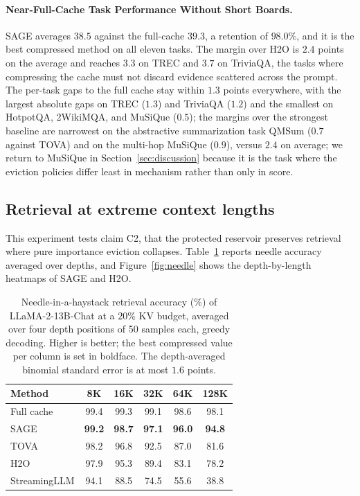 \paragraph{Near-Full-Cache Task Performance Without Short Boards.}
SAGE averages $38.5$ against the full-cache $39.3$, a retention of
$98.0\%$, and it is the best compressed method on all eleven tasks.
The margin over H2O is $2.4$ points on the average and reaches
$3.3$ on TREC and $3.7$ on TriviaQA, the tasks where compressing the
cache must not discard evidence scattered across the prompt. The
per-task gaps to the full cache stay within $1.3$ points everywhere,
with the largest absolute gaps on TREC ($1.3$) and TriviaQA ($1.2$)
and the smallest on HotpotQA, 2WikiMQA, and MuSiQue ($0.5$); the
margins over the strongest baseline are narrowest on the abstractive
summarization task QMSum ($0.7$ against TOVA) and on the multi-hop
MuSiQue ($0.9$), versus $2.4$ on average; we return to MuSiQue in
Section~\ref{sec:discussion} because it is the task where the eviction
policies differ least in mechanism rather than only in score.

\subsection{Retrieval at extreme context lengths}\label{sec:exp_needle}

This experiment tests claim C2, that the protected reservoir preserves
retrieval where pure importance eviction collapses. Table~\ref{tab:needle}
reports needle accuracy averaged over depths, and
Figure~\ref{fig:needle} shows the depth-by-length heatmaps of SAGE and
H2O.

\begin{table}[t]
\centering
\caption{Needle-in-a-haystack retrieval accuracy (\%) of
LLaMA-2-13B-Chat at a $20\%$ KV budget, averaged over four depth
positions of 50 samples each, greedy decoding. Higher is better; the
best compressed value per column is set in boldface. The
depth-averaged binomial standard error is at most $1.6$ points.}
\label{tab:needle}
\small
\begin{tabular*}{0.8\textwidth}{@{\extracolsep{\fill}} l ccccc}
\toprule
Method & 8K & 16K & 32K & 64K & 128K \\
\midrule
Full cache   & 99.4 & 99.3 & 99.1 & 98.6 & 98.1 \\
SAGE         & \textbf{99.2} & \textbf{98.7} & \textbf{97.1} & \textbf{96.0} & \textbf{94.8} \\
TOVA         & 98.2 & 96.8 & 92.5 & 87.0 & 81.6 \\
H2O          & 97.9 & 95.3 & 89.4 & 83.1 & 78.2 \\
StreamingLLM & 94.1 & 88.5 & 74.5 & 55.6 & 38.8 \\
\bottomrule
\end{tabular*}
\end{table}

